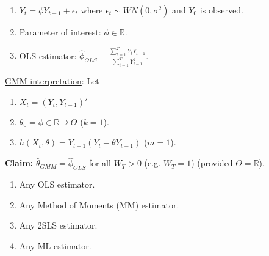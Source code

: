 \documentclass[11pt]{elegantbook}
\begin{document}
\begin{example}
    \begin{enumerate}
        \item $Y_t=\phi Y_{t-1}+\epsilon_t$ where $\epsilon_t\sim WN(0,\sigma^2)$ and $Y_0$ is observed.
        \item Parameter of interest: $\phi\in \mathbb{R}$.
        \item OLS estimator: $\hat{\phi}_{OLS}=\frac{\sum_{t=1}^T Y_tY_{t-1}}{\sum_{t=1}^T Y_{t-1}^2}$.
    \end{enumerate}
    \underline{GMM interpretation}: Let
    \begin{enumerate}
        \item $X_t=(Y_t,Y_{t-1})'$
        \item $\theta_0=\phi\in \mathbb{R}\supseteq \Theta$ ($k=1$).
        \item $h(X_t,\theta)=Y_{t-1}(Y_t-\theta Y_{t-1})$ ($m=1$).
    \end{enumerate}
    \textbf{Claim:} $\hat{\theta}_{GMM}=\hat{\phi}_{OLS}$ for all $W_T>0$ (e.g. $W_T=1$) (provided $\Theta= \mathbb{R}$).
\end{example}

\begin{example}
    \begin{enumerate}
        \item Any OLS estimator.
        \item Any Method of Moments (MM) estimator.
        \item Any 2SLS estimator.
        \item Any ML estimator.
    \end{enumerate}
\end{example}
\end{document}
